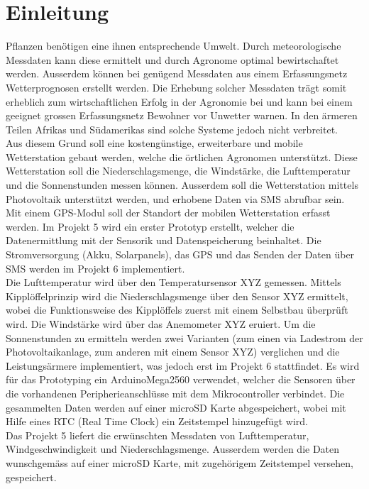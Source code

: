 \section{Einleitung}
Pflanzen benötigen eine ihnen entsprechende Umwelt. Durch meteorologische Messdaten kann diese ermittelt und durch Agronome optimal bewirtschaftet werden. Ausserdem können bei genügend Messdaten aus einem Erfassungsnetz Wetterprognosen erstellt werden. Die Erhebung solcher Messdaten trägt somit erheblich zum wirtschaftlichen Erfolg in der Agronomie bei und kann bei einem geeignet grossen Erfassungsnetz Bewohner vor Unwetter warnen. In den ärmeren Teilen Afrikas und Südamerikas sind solche Systeme jedoch nicht verbreitet.\\[0.5cm]
Aus diesem Grund soll eine kostengünstige, erweiterbare und mobile Wetterstation gebaut werden, welche die örtlichen Agronomen unterstützt. Diese Wetterstation soll die Niederschlagsmenge, die Windstärke, die Lufttemperatur und die Sonnenstunden messen können. Ausserdem soll die Wetterstation mittels Photovoltaik unterstützt werden, und erhobene Daten via SMS abrufbar sein. Mit einem GPS-Modul soll der Standort der mobilen Wetterstation erfasst werden. Im Projekt 5 wird ein erster Prototyp erstellt, welcher die Datenermittlung mit der Sensorik und Datenspeicherung beinhaltet. Die Stromversorgung (Akku, Solarpanels), das GPS und das Senden der Daten über SMS werden im Projekt 6 implementiert.\\[0.5cm]
Die Lufttemperatur wird über den Temperatursensor XYZ gemessen. Mittels Kipplöffelprinzip wird die Niederschlagsmenge über den Sensor XYZ ermittelt, wobei die Funktionsweise des Kipplöffels zuerst mit einem Selbstbau überprüft wird. Die Windstärke wird über das Anemometer XYZ eruiert. Um die Sonnenstunden zu ermitteln werden zwei Varianten (zum einen via Ladestrom der Photovoltaikanlage, zum anderen mit einem Sensor XYZ) verglichen und die Leistungsärmere implementiert, was jedoch erst im Projekt 6 stattfindet. Es wird für das Prototyping ein ArduinoMega2560 verwendet, welcher die Sensoren über die vorhandenen Peripherieanschlüsse mit dem Mikrocontroller verbindet. Die gesammelten Daten werden auf einer microSD Karte abgespeichert, wobei mit Hilfe eines RTC (Real Time Clock) ein Zeitstempel hinzugefügt wird.\\[0.5cm]
Das Projekt 5 liefert die erwünschten Messdaten von Lufttemperatur, Windgeschwindigkeit und Niederschlagsmenge. Ausserdem werden die Daten wunschgemäss auf einer microSD Karte, mit zugehörigem Zeitstempel versehen, gespeichert.

